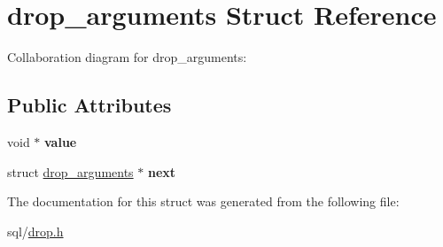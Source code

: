 \hypertarget{structdrop__arguments}{}\section{drop\+\_\+arguments Struct Reference}
\label{structdrop__arguments}


Collaboration diagram for drop\+\_\+arguments\+:
\subsection*{Public Attributes}
\begin{DoxyCompactItemize}
\item 
void $\ast$ {\bfseries value}\hypertarget{structdrop__arguments_a83524221500748a3fbee93a486ffabba}{}\label{structdrop__arguments_a83524221500748a3fbee93a486ffabba}

\item 
struct \hyperlink{structdrop__arguments}{drop\+\_\+arguments} $\ast$ {\bfseries next}\hypertarget{structdrop__arguments_a4375506674ae5bda2167689436c3ed47}{}\label{structdrop__arguments_a4375506674ae5bda2167689436c3ed47}

\end{DoxyCompactItemize}


The documentation for this struct was generated from the following file\+:\begin{DoxyCompactItemize}
\item 
sql/\hyperlink{drop_8h}{drop.\+h}\end{DoxyCompactItemize}
